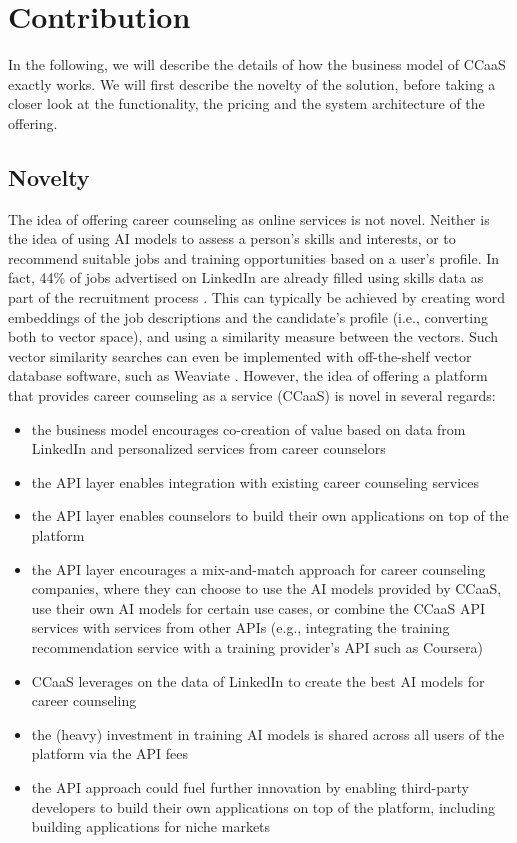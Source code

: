 \section{Contribution}
\label{sec:contribution}

In the following, we will describe the details of how the business model of CCaaS exactly works.
We will first describe the novelty of the solution, before taking a closer look at the functionality,
the pricing and the system architecture of the offering.

\subsection{Novelty}

The idea of offering career counseling as online services is not novel. Neither is the idea of
using AI models to assess a person's skills and interests, or to recommend suitable jobs and training
opportunities based on a user's profile. In fact, 44\% of jobs advertised on LinkedIn are already
filled using skills data as part of the recruitment process \citep{kaserAIpoweredCareerCounseling2023}.
This can typically be achieved by creating word embeddings of the job descriptions and the candidate's
profile (i.e., converting both to vector space), and using a similarity measure between the
vectors. Such vector similarity searches can even be implemented with off-the-shelf vector database
software, such as Weaviate \citep{dilockerWeaviate2023}. However, the idea of offering a platform that
provides career counseling as a service (CCaaS) is novel in several regards:

\begin{itemize}
    \item the business model encourages co-creation of value based on data from LinkedIn and
        personalized services from career counselors
    \item the API layer enables integration with existing career counseling services
    \item the API layer enables counselors to build their own applications on top of the platform
    \item the API layer encourages a mix-and-match approach for career counseling companies, where
        they can choose to use the AI models provided by CCaaS, use their own AI models for certain 
        use cases, or combine the CCaaS API services with services from other APIs (e.g., integrating 
        the training recommendation service with a training provider's API such as Coursera)
    \item CCaaS leverages on the data of LinkedIn to create the best AI models for career
        counseling
    \item the (heavy) investment in training AI models is shared across all users of the platform
        via the API fees
    \item the API approach could fuel further innovation by enabling third-party developers to
        build their own applications on top of the platform, including building applications for 
        niche markets
\end{itemize}

